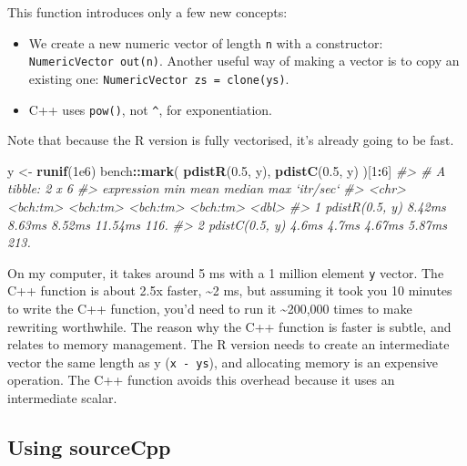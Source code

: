 \documentclass[]{book}
\newenvironment{Shaded}{\begin{snugshade}}{\end{snugshade}}
\newcommand{\CommentTok}[1]{\textcolor[rgb]{0.37,0.37,0.37}{\textit{#1}}}
\newcommand{\DecValTok}[1]{\textcolor[rgb]{0.06,0.06,0.06}{#1}}
\newcommand{\FloatTok}[1]{\textcolor[rgb]{0.06,0.06,0.06}{#1}}
\newcommand{\KeywordTok}[1]{\textcolor[rgb]{0.27,0.27,0.27}{\textbf{#1}}}
\newcommand{\NormalTok}[1]{#1}
\newcommand{\OperatorTok}[1]{\textcolor[rgb]{0.43,0.43,0.43}{\textbf{#1}}}
\newcommand{\StringTok}[1]{\textcolor[rgb]{0.5,0.5,0.5}{#1}}
\begin{document}
This function introduces only a few new concepts:

\begin{itemize}
\item
  We create a new numeric vector of length \texttt{n} with a constructor:
  \texttt{NumericVector\ out(n)}. Another useful way of making a vector is to copy an
  existing one: \texttt{NumericVector\ zs\ =\ clone(ys)}.
\item
  C++ uses \texttt{pow()}, not \texttt{\^{}}, for exponentiation.
\end{itemize}

Note that because the R version is fully vectorised, it's already going to be fast.

\begin{Shaded}
\begin{Highlighting}[]
\NormalTok{y <-}\StringTok{ }\KeywordTok{runif}\NormalTok{(}\FloatTok{1e6}\NormalTok{)}
\NormalTok{bench}\OperatorTok{::}\KeywordTok{mark}\NormalTok{(}
  \KeywordTok{pdistR}\NormalTok{(}\FloatTok{0.5}\NormalTok{, y),}
  \KeywordTok{pdistC}\NormalTok{(}\FloatTok{0.5}\NormalTok{, y)}
\NormalTok{)[}\DecValTok{1}\OperatorTok{:}\DecValTok{6}\NormalTok{]}
\CommentTok{#> # A tibble: 2 x 6}
\CommentTok{#>   expression          min     mean   median      max `itr/sec`}
\CommentTok{#>   <chr>          <bch:tm> <bch:tm> <bch:tm> <bch:tm>     <dbl>}
\CommentTok{#> 1 pdistR(0.5, y)   8.42ms   8.63ms   8.52ms  11.54ms      116.}
\CommentTok{#> 2 pdistC(0.5, y)    4.6ms    4.7ms   4.67ms   5.87ms      213.}
\end{Highlighting}
\end{Shaded}

On my computer, it takes around 5 ms with a 1 million element \texttt{y} vector. The C++ function is about 2.5x faster, \textasciitilde{}2 ms, but assuming it took you 10 minutes to write the C++ function, you'd need to run it \textasciitilde{}200,000 times to make rewriting worthwhile. The reason why the C++ function is faster is subtle, and relates to memory management. The R version needs to create an intermediate vector the same length as y (\texttt{x\ -\ ys}), and allocating memory is an expensive operation. The C++ function avoids this overhead because it uses an intermediate scalar.

\hypertarget{sourceCpp}{%
\subsection{Using sourceCpp}\label{sourceCpp}}
\end{document}

